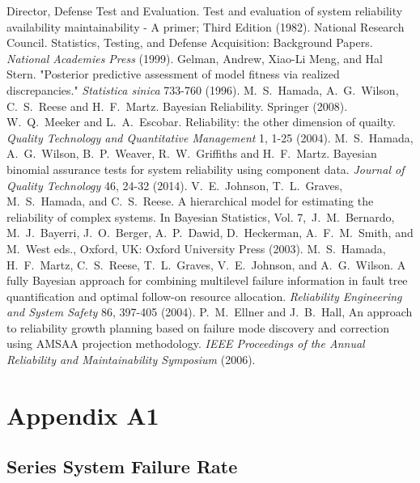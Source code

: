 \documentclass[12pt]{article}
\begin{document}
\begin{thebibliography}{99}
 Director, Defense Test and Evaluation. Test and evaluation of
system reliability availability maintainability - A primer; Third Edition
(1982).
 National Research Council. Statistics, Testing, and Defense
Acquisition: Background Papers. \textit{National Academies Press} (1999).
 Gelman, Andrew, Xiao-Li Meng, and Hal Stern. "Posterior
predictive assessment of model fitness via realized discrepancies."
\textit{Statistica sinica} 733-760 (1996).
 M.\ S.\ Hamada, A.\ G.\ Wilson, C.\ S.\ Reese and H.\ F.\ Martz.
Bayesian Reliability. Springer (2008).
 W.\ Q.\ Meeker and L.\ A.\
Escobar. Reliability: the other dimension of quailty. \textit{Quality Technology
and Quantitative Management} 1, 1-25 (2004). \bibitem{HWWGM13} M.\ S.\ Hamada,
A.\ G.\ Wilson, B.\ P.\ Weaver, R.\ W.\ Griffiths and H.\ F.\ Martz. Bayesian
binomial assurance tests for system reliability using component data.
\textit{Journal of Quality Technology} 46, 24-32 (2014).  V.\
E.\ Johnson, T.\ L.\ Graves, M.\ S.\ Hamada, and C.\ S.\ Reese. A hierarchical
model for estimating the reliability of complex systems. In Bayesian Statistics,
Vol. 7,\ J.\ M.\ Bernardo, M.\ J.\ Bayerri, J.\ O.\ Berger, A.\ P.\ Dawid, D.\
Heckerman, A.\ F.\ M.\ Smith, and M.\ West eds., Oxford, UK: Oxford University
Press (2003). \bibitem{HMRGJW04} M.\ S.\ Hamada, H.\ F.\ Martz, C.\ S.\ Reese,
T.\ L.\ Graves, V.\ E.\ Johnson, and A.\ G.\ Wilson. A fully Bayesian approach
for combining multilevel failure information in fault tree quantification and
optimal follow-on resource allocation. \textit{Reliability Engineering and
System Safety} 86, 397-405 (2004). \bibitem{EH06} P.\ M.\ Ellner and J.\ B.\
Hall, An approach to reliability growth planning based on failure mode discovery
and correction using AMSAA projection methodology. \textit{IEEE Proceedings of
the Annual Reliability and Maintainability Symposium} (2006).
\end{thebibliography}

\section{Appendix A1}
\subsection{Series System Failure Rate}
\end{document}

